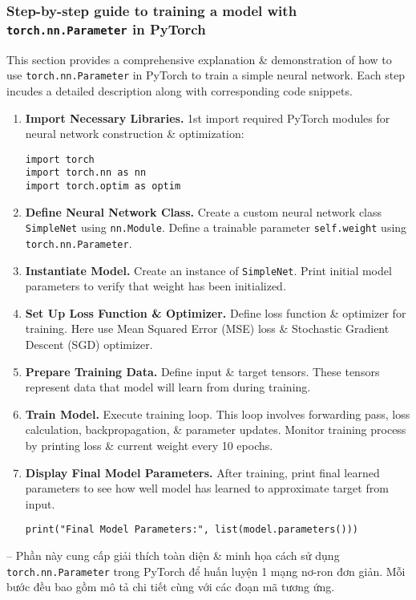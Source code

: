 \documentclass{article}
\begin{document}
\subsubsection{Step-by-step guide to training a model with {\tt torch.nn.Parameter} in PyTorch}
This section provides a comprehensive explanation \& demonstration of how to use {\tt torch.nn.Parameter} in PyTorch to train a simple neural network. Each step incudes a detailed description along with corresponding code snippets.
\begin{enumerate}
    \item {\bf Import Necessary Libraries.} 1st import required PyTorch modules for neural network construction \& optimization:
    \begin{verbatim}
import torch
import torch.nn as nn
import torch.optim as optim
    \end{verbatim}
    \item {\bf Define Neural Network Class.} Create a custom neural network class {\tt SimpleNet} using {\tt nn.Module}. Define a trainable parameter {\tt self.weight} using {\tt torch.nn.Parameter}.
    \item {\bf Instantiate Model.} Create an instance of {\tt SimpleNet}. Print initial model parameters to verify that weight has been initialized.
    \item {\bf Set Up Loss Function \& Optimizer.} Define loss function \& optimizer for training. Here use Mean Squared Error (MSE) loss \& Stochastic Gradient Descent (SGD) optimizer.
    \item {\bf Prepare Training Data.} Define input \& target tensors. These tensors represent data that model will learn from during training.
    \item {\bf Train Model.} Execute training loop. This loop involves forwarding pass, loss calculation, backpropagation, \& parameter updates. Monitor training process by printing loss \& current weight every 10 epochs.
    \item {\bf Display Final Model Parameters.} After training, print final learned parameters to see how well model has learned to approximate target from input.
    \begin{verbatim}
print("Final Model Parameters:", list(model.parameters()))
    \end{verbatim}
\end{enumerate}
-- Phần này cung cấp giải thích toàn diện \& minh họa cách sử dụng {\tt torch.nn.Parameter} trong PyTorch để huấn luyện 1 mạng nơ-ron đơn giản. Mỗi bước đều bao gồm mô tả chi tiết cùng với các đoạn mã tương ứng.
\end{document}
